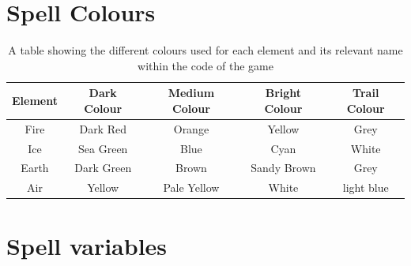 \documentclass[12pt,a4paper]{report}
\begin{document}
\section{Spell Colours}

\begin{table}
    \begin{tabular}{|c|c|c|c|c|}
        \hline
        Element & Dark Colour & Medium Colour & Bright Colour & Trail Colour \\
        \hline
        Fire    & Dark Red    & Orange        & Yellow        & Grey         \\
        Ice     & Sea Green   & Blue          & Cyan          & White        \\
        Earth   & Dark Green  & Brown         & Sandy Brown   & Grey         \\
        Air     & Yellow      & Pale Yellow   & White         & light blue   \\
        \hline
    \end{tabular}
    \caption{A table showing the different colours used for each element and its relevant name within the code of the game}
    \label{spellColour}
\end{table}

\section{Spell variables} \label{spellVariables}
\end{document}
